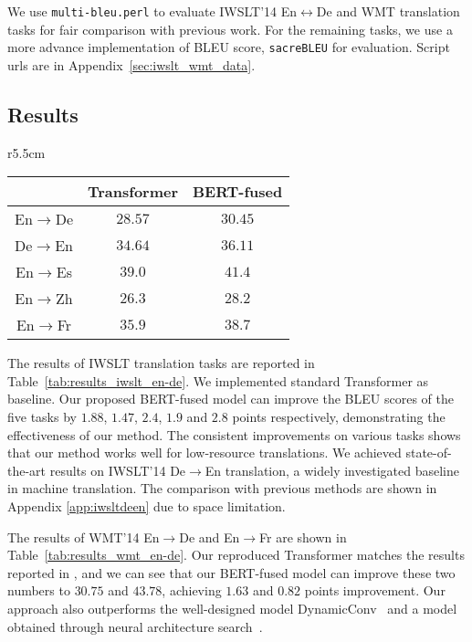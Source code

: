 \documentclass{article} \usepackage{iclr2020_conference,times}
\begin{document}
We use \texttt{multi-bleu.perl} to evaluate IWSLT'14 En$\leftrightarrow$De and WMT translation tasks for fair comparison with previous work. For the remaining tasks, we use a more advance implementation of BLEU score, \texttt{sacreBLEU} for evaluation. Script urls are in Appendix~\ref{sec:iwslt_wmt_data}.

\subsection{Results}

\begin{wraptable}{r}{5.5cm}
\vspace{-0.6cm}
\small
\centering
\caption{BLEU of all IWSLT  tasks.}
\begin{tabular}{c c c }
\toprule
& Transformer & BERT-fused  \\
\midrule
En$\to$De & $28.57$ & $30.45$ \\
De$\to$En & $34.64$ & $36.11$  \\
En$\to$Es & $39.0$ & $41.4$ \\
En$\to$Zh & $26.3$ & $28.2$ \\
En$\to$Fr & $35.9$ & $38.7$ \\
\bottomrule
\end{tabular}
\label{tab:results_iwslt_en-de}
\end{wraptable}

The results of IWSLT translation tasks are reported in Table~\ref{tab:results_iwslt_en-de}. We implemented standard Transformer as baseline. Our proposed BERT-fused model can improve the BLEU scores of the five tasks by $1.88$, $1.47$, $2.4$, $1.9$ and $2.8$ points respectively, demonstrating the effectiveness of our method. The consistent improvements on various tasks shows that our method works well for low-resource translations. We achieved state-of-the-art results on IWSLT'14 De$\to$En translation, a widely investigated baseline in machine translation. The comparison with previous methods are shown in Appendix \ref{app:iwsltdeen} due to space limitation. 



The results of WMT'14 En$\to$De and En$\to$Fr are shown in Table~\ref{tab:results_wmt_en-de}. Our reproduced Transformer matches the results reported in \cite{ott2018scaling}, and we can see that our BERT-fused model can improve these two numbers to $30.75$ and $43.78$, achieving $1.63$ and $0.82$ points improvement. Our approach also outperforms the well-designed model DynamicConv~\citep{wu2019pay} and a model obtained through neural architecture search~\citep{so2019evolved}.
\end{document}
